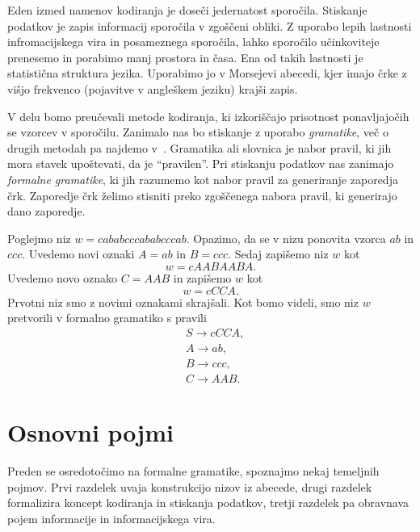 \documentclass[fin1, tisk]{fmfdelo}
\theoremstyle{definition}
\begin{document}
Eden izmed namenov kodiranja je doseči jedernatost sporočila. Stiskanje podatkov 
je zapis informacij sporočila v zgoščeni obliki. Z uporabo lepih lastnosti infromacijskega vira 
in posameznega sporočila, lahko sporočilo učinkoviteje prenesemo in porabimo manj prostora in časa.
Ena od takih lastnosti je statistična struktura jezika. Uporabimo jo v Morsejevi abecedi, kjer
imajo črke z višjo frekvenco (pojavitve v angleškem jeziku) krajši zapis. %

V delu bomo preučevali metode kodiranja, ki izkoriščajo prisotnost ponavljajočih se vzorcev
v sporočilu. Zanimalo nas bo stiskanje z uporabo \emph{gramatike}, več o drugih metodah pa najdemo 
v~\cite{Sayood2017}. Gramatika ali slovnica je nabor pravil, ki jih mora stavek 
upoštevati, da je ``pravilen''. Pri stiskanju podatkov nas zanimajo \emph{formalne gramatike}, 
ki jih razumemo kot nabor pravil za generiranje zaporedja črk. Zaporedje črk želimo 
stisniti preko zgoščenega nabora pravil, ki generirajo dano zaporedje.

\begin{primer}
    \label{primer:motivacija}
    Poglejmo niz $w =\mathit{cababcccababcccab}$.
    Opazimo, da se v nizu ponovita vzorca $\mathit{ab}$ in $\mathit{ccc}$. Uvedemo novi oznaki
    $A = \mathit{ab}$ in $B = \mathit{ccc}$. Sedaj zapišemo niz $w$ kot
    \[
        w = \mathit{cAABAABA}.
    \]
    Uvedemo novo oznako $C = \mathit{AAB}$
    in zapišemo $w$ kot
    \[
        w = \mathit{cCCA}.
    \]
    Prvotni niz smo z novimi oznakami skrajšali. Kot bomo videli, smo niz $w$ pretvorili v 
    formalno gramatiko s pravili
    \begin{align*}
        & S  \rightarrow \mathit{cCCA}, \\
        & A  \rightarrow \mathit{ab}, \\
        & B  \rightarrow \mathit{ccc}, \\
        & C  \rightarrow \mathit{AAB}.
    \end{align*}
\end{primer}

\section{Osnovni pojmi}

Preden se osredotočimo na formalne gramatike, spoznajmo nekaj temeljnih pojmov.
Prvi razdelek uvaja konstrukcijo nizov iz abecede, drugi razdelek formalizira koncept kodiranja 
in stiskanja podatkov, tretji razdelek pa obravnava pojem informacije in informacijskega vira.
\end{document}
